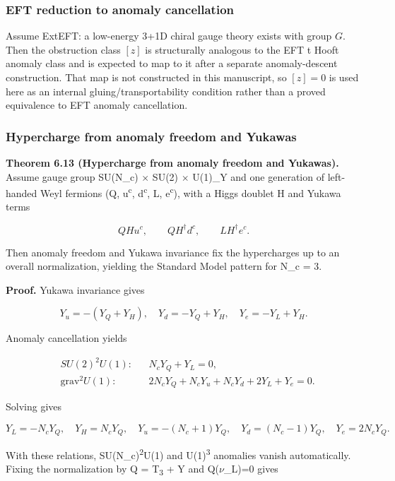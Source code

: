 \subsubsection{EFT reduction to anomaly cancellation}\label{67-eft-reduction-to-anomaly-cancellation}

Assume ExtEFT: a low-energy 3+1D chiral gauge theory exists with group \(G\). Then the obstruction class \([z]\) is structurally analogous to the EFT \textquotesingle t Hooft anomaly class and is expected to map to it after a separate anomaly-descent construction. That map is not constructed in this manuscript, so \([z]=0\) is used here as an internal gluing/transportability condition rather than a proved equivalence to EFT anomaly cancellation.

\subsubsection{Hypercharge from anomaly freedom and Yukawas}\label{68-hypercharge-from-anomaly-freedom-and-yukawas}

\textbf{Theorem 6.13 (Hypercharge from anomaly freedom and Yukawas).} Assume gauge group SU(N\_c) \ensuremath{\times} SU(2) \ensuremath{\times} U(1)\_Y and one generation of left-handed Weyl fermions (Q, u\textsuperscript{c}, d\textsuperscript{c}, L, e\textsuperscript{c}), with a Higgs doublet H and Yukawa terms

\[
Q H u^c,\qquad Q H^\dagger d^c,\qquad L H^\dagger e^c.
\]

Then anomaly freedom and Yukawa invariance fix the hypercharges up to an overall normalization, yielding the Standard Model pattern for N\_c = 3.

\textbf{Proof.} Yukawa invariance gives

\[
Y_u = -(Y_Q + Y_H),\quad
Y_d = -Y_Q + Y_H,\quad
Y_e = -Y_L + Y_H.
\]

Anomaly cancellation yields

\[
\begin{aligned}
&SU(2)^2 U(1): && N_c Y_Q + Y_L = 0,\\
&\mathrm{grav}^2 U(1): && 2 N_c Y_Q + N_c Y_u + N_c Y_d + 2 Y_L + Y_e = 0.
\end{aligned}
\]

Solving gives

\[
Y_L = -N_c Y_Q,\quad
Y_H = N_c Y_Q,\quad
Y_u = -(N_c + 1) Y_Q,\quad
Y_d = (N_c - 1) Y_Q,\quad
Y_e = 2 N_c Y_Q.
\]

With these relations, SU(N\_c)\textsuperscript{2}U(1) and U(1)\textsuperscript{3} anomalies vanish automatically. Fixing the normalization by Q = T\textsubscript{3} + Y and Q(\ensuremath{\nu}\_L)=0 gives

